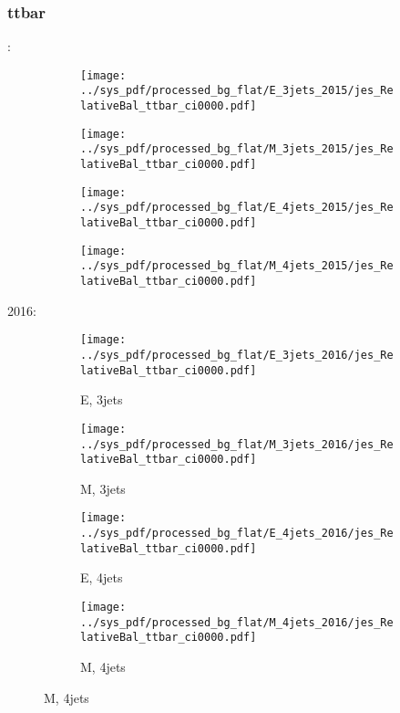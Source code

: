 \documentclass{beamer}
\begin{document}
\begin{frame}
\frametitle{ttbar}
\fontsize{5}{1}:
\begin{figure}
\centering
\begin{subfigure}[b]{0.24\textwidth}
\texttt{[image: ../sys\_pdf/processed\_bg\_flat/E\_3jets\_2015/jes\_RelativeBal\_ttbar\_ci0000.pdf]}
\end{subfigure}
\begin{subfigure}[b]{0.24\textwidth}
\texttt{[image: ../sys\_pdf/processed\_bg\_flat/M\_3jets\_2015/jes\_RelativeBal\_ttbar\_ci0000.pdf]}
\end{subfigure}
\begin{subfigure}[b]{0.24\textwidth}
\texttt{[image: ../sys\_pdf/processed\_bg\_flat/E\_4jets\_2015/jes\_RelativeBal\_ttbar\_ci0000.pdf]}
\end{subfigure}
\begin{subfigure}[b]{0.24\textwidth}
\texttt{[image: ../sys\_pdf/processed\_bg\_flat/M\_4jets\_2015/jes\_RelativeBal\_ttbar\_ci0000.pdf]}
\end{subfigure}
\end{figure}
2016:
\begin{figure}
\centering
\begin{subfigure}[b]{0.24\textwidth}
\texttt{[image: ../sys\_pdf/processed\_bg\_flat/E\_3jets\_2016/jes\_RelativeBal\_ttbar\_ci0000.pdf]}
\captionsetup{font=tiny}
\caption{E, 3jets}
\end{subfigure}
\begin{subfigure}[b]{0.24\textwidth}
\texttt{[image: ../sys\_pdf/processed\_bg\_flat/M\_3jets\_2016/jes\_RelativeBal\_ttbar\_ci0000.pdf]}
\captionsetup{font=tiny}
\caption{M, 3jets}
\end{subfigure}
\begin{subfigure}[b]{0.24\textwidth}
\texttt{[image: ../sys\_pdf/processed\_bg\_flat/E\_4jets\_2016/jes\_RelativeBal\_ttbar\_ci0000.pdf]}
\captionsetup{font=tiny}
\caption{E, 4jets}
\end{subfigure}
\begin{subfigure}[b]{0.24\textwidth}
\texttt{[image: ../sys\_pdf/processed\_bg\_flat/M\_4jets\_2016/jes\_RelativeBal\_ttbar\_ci0000.pdf]}
\captionsetup{font=tiny}
\caption{M, 4jets}
\end{subfigure}
\end{figure}
\end{frame}
\end{document}

